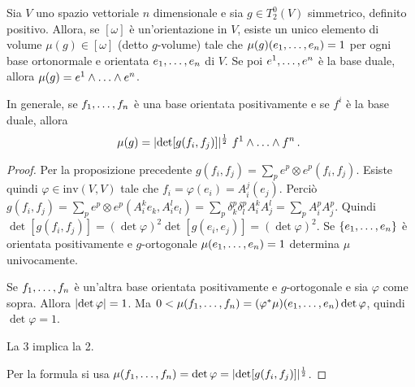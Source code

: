 \begin{proposition}
	Sia $V$ uno spazio vettoriale $n$ dimensionale e sia $g\in T^0_2(V)$ simmetrico, definito positivo. Allora, se $[\omega]$ è un'orientazione in $V$, esiste un unico elemento di volume $\mu(g) \in [\omega]$ (detto $g$-volume) tale che $\mu(g)(\seqb en,) = 1$ per ogni base ortonormale e orientata $\seqb en,$ di $V$.
	Se poi $\seqa en,$ è la base duale, allora $\mu(g) = \seqa en\wedge$.
	
	In generale, se $\seqb fn,$ è una base orientata positivamente e se $f^i$ è la base duale, allora
	\begin{equation*}
		\mu(g) = \abs{ \det[g(f_i,f_j)] }^{\frac 12}\ \seqa fn\wedge \punto
	\end{equation*}
\end{proposition}
\begin{proof}
	Per la proposizione precedente $g(f_i,f_j) = \sum_p e^p\otimes e^p (f_i,f_j)$. Esiste quindi $\varphi \in \mathrm{inv}(V,V)$ tale che $f_i = \varphi(e_i) = A_i^j(e_j)$.
	Perciò $g(f_i,f_j) = \sum_p e^p\otimes e^p (A_i^k e_k, A_i^le_l) = \sum_p \delta_k^p \delta_l^p A_i^k A_j^l = \sum_pA_i^pA_j^p$.
	Quindi $\det[g(f_i,f_j)] = (\det\varphi)^2\det[g(e_i,e_j)] = (\det\varphi)^2$.
	Se $\{\seqb en,\}$ è orientata positivamente e $g$-ortogonale $\mu(\seqb en,) = 1$ determina $\mu$ univocamente.
	
	Se $\seqb fn,$ è un'altra base orientata positivamente e $g$-ortogonale e sia $\varphi$ come sopra. Allora $\abs{\det\varphi} = 1$. Ma $0<\mu(\seqb fn,) = (\varphi^*\mu)(\seqb en,)\det\varphi$, quindi $\det\varphi=1$.
	
	La 3 implica la 2.
	
	Per la formula si usa $\mu(\seqb fn,) = \det\varphi = \abs{ \det[g(f_i,f_j)] }^\frac 12$.
\end{proof}
































































